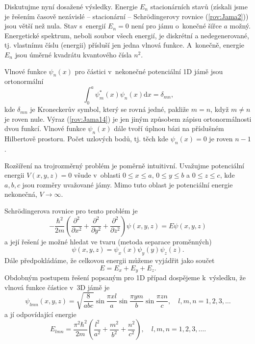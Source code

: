 Diskutujme nyní dosažené výsledky. Energie $E_n$ stacionárních stavů (získali jsme je řešením časově nezávislé -- stacionární -- Schrödingerovy rovnice (\ref{rov:Jama2})) jsou větší než nula. Stav s~energií $E_n=0$ není pro jámu o~konečné šířce $a$ možný. Energetické spektrum, neboli soubor všech energií, je diskrétní a nedegenerované, tj. vlastnímu číslu (energii) přísluší jen jedna vlnová funkce. A~konečně, energie $E_n$ jsou úměrné kvadrátu kvantového čísla $n^2$.

Vlnové funkce $\psi_n(x)$ pro částici v~nekonečné potenciální 1D jámě jsou ortonormální
\begin{equation}
\int_0^a \psi_m^\ast(x) \psi_n(x) \mathrm{d}x = \delta_{mn} \mbox{,}
\label{rov:Jama14}
\end{equation}
kde $\delta_{mn}$ je Kroneckerův symbol, který se rovná jedné, pakliže $m=n$, když $m \not = n$ je roven nule. Výraz (\ref{rov:Jama14}) je jen jiným způsobem zápisu ortonormálnosti dvou funkcí. Vlnové funkce $\psi_n(x)$ dále tvoří úplnou bázi na příslušném Hilbertově prostoru. Počet uzlových bodů, tj. těch kde $\psi_n(x)=0$ je roven $n-1$.

Rozšíření na trojrozměrný problém je poměrně intuitivní. Uvažujme potenciální energii $V(x,y,z) = 0$ všude v~oblasti $0\leq x\leq a$, $0\leq y \leq b$ a $0\leq z \leq c$, kde $a, b, c$ jsou rozměry uvažované jámy. Mimo tuto oblast je potenciální energie nekonečná, $V \rightarrow \infty$.

Schrödingerova rovnice pro tento problém je
\begin{equation}
-\frac{\hbar^2}{2m} \left(\frac{\partial^2}{\partial x^2} + \frac{\partial^2}{\partial y^2} + \frac{\partial^2}{\partial z^2} \right) \psi(x,y,z) = E \psi(x,y,z)
\label{rov:Jama15}
\end{equation}
a její řešení je možné hledat ve tvaru (metoda separace proměnných) 
\begin{equation}
\psi(x,y,z) = \psi_x(x)\psi_y(y)\psi_z(z) \mbox{.}
\label{rov:Jama16}
\end{equation}
Dále předpokládáme, že celkovou energii můžeme vyjádřit jako součet
\begin{equation}
E = E_x + E_y + E_z \mbox{.}
\label{rov:Jama17}
\end{equation}
Obdobným postupem řešení popsaným pro 1D případ dospějeme k~výsledku, že vlnová funkce částice v~3D jámě je
\begin{equation}
\psi_{lmn}(x,y,z) = \sqrt{\frac{8}{abc}} \sin \frac{\pi xl}{a}\sin \frac{\pi ym}{b} \sin \frac{\pi zn}{c}, \quad l,m,n = 1,2,3, \dots
\label{rov:Jama18}
\end{equation}
a jí odpovídající energie
\begin{equation}
E_{lmn} = \frac{\pi^2\hbar^2}{2m} \left(\frac{l^2}{a^2} + \frac{m^2}{b^2} + \frac{n^2}{c^2} \right), \quad l,m,n = 1,2,3, \dots \mbox{.}
\label{rov:Jama19} 
\end{equation}

